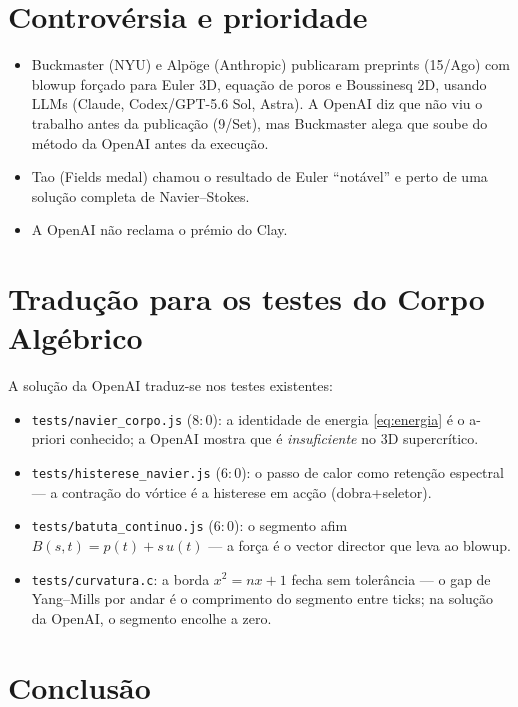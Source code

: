 \documentclass[11pt,a4paper]{article}
\newcommand\code[1]{\texttt{\small #1}}
\begin{document}
\section{Controvérsia e prioridade}\label{sec:prioridade}
\begin{itemize}
\item Buckmaster (NYU) e Alpöge (Anthropic) publicaram preprints
  (15/Ago) com blowup forçado para Euler 3D, equação de poros
  e Boussinesq 2D, usando LLMs (Claude, Codex/GPT-5.6 Sol, Astra).
  A OpenAI diz que não viu o trabalho antes da publicação
  (9/Set), mas Buckmaster alega que soube do método da OpenAI
  antes da execução.
\item Tao (Fields medal) chamou o resultado de Euler
  ``notável'' e perto de uma solução completa de Navier--Stokes.
\item A OpenAI não reclama o prémio do Clay.
\end{itemize}

\section{Tradução para os testes do Corpo Algébrico}\label{sec:testes}

A solução da OpenAI traduz-se nos testes existentes:
\begin{itemize}
\item \code{tests/navier\_corpo.js} ($8{:}0$): a identidade de
  energia \eqref{eq:energia} é o a-priori conhecido; a OpenAI
  mostra que é \emph{insuficiente} no 3D supercrítico.
\item \code{tests/histerese\_navier.js} ($6{:}0$): o passo de
  calor como retenção espectral --- a contração do vórtice é
  a histerese em acção (dobra+seletor).
\item \code{tests/batuta\_continuo.js} ($6{:}0$): o segmento
  afim $B(s,t)=p(t)+s\,u(t)$ --- a força é o vector director
  que leva ao blowup.
\item \code{tests/curvatura.c}: a borda $x^2=nx+1$ fecha sem
  tolerância --- o gap de Yang--Mills por andar é o comprimento
  do segmento entre ticks; na solução da OpenAI, o segmento
  encolhe a zero.
\end{itemize}

\section{Conclusão}\label{sec:conclusao}
\end{document}
